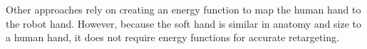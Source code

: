 Other approaches \cite{sivakumar2022robotic} rely on creating an energy function to map the human hand to the robot hand.  However, because the soft hand is similar in anatomy and size to a human hand, it does not require energy functions for accurate retargeting.

